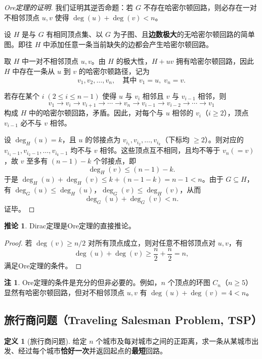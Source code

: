 \documentclass[UTF8,11pt,a4paper]{ctexbook}   %
\theoremstyle{definition}
\newtheorem{definition}{定义}[section]
\newtheorem{remark}{注}[section]
\newtheorem{corollary}{推论}[section]
\begin{document}
\begin{proof}[Ore定理的证明]
我们证明其逆否命题：若 $G$ 不存在哈密尔顿回路，则必存在一对不相邻顶点 $u,v$ 使得 $\deg(u)+\deg(v)<n$。

设 $H$ 是与 $G$ 有相同顶点集、以 $G$ 为子图、且\textbf{边数极大}的无哈密尔顿回路的简单图。即往 $H$ 中添加任意一条当前缺失的边都会产生哈密尔顿回路。

取 $H$ 中一对不相邻顶点 $u,v$。由 $H$ 的极大性，$H+uv$ 拥有哈密尔顿回路，因此 $H$ 中存在一条从 $u$ 到 $v$ 的哈密尔顿路径，记为
\[
v_1,v_2,\dots,v_n,\quad\text{其中 }v_1=u,\;v_n=v.
\]

若存在某个 $i\;(2\le i\le n-1)$ 使得 $u$ 与 $v_i$ 相邻且 $v$ 与 $v_{i-1}$ 相邻，则
\[
v_1\to v_i\to v_{i+1}\to\cdots\to v_n\to v_{i-1}\to v_{i-2}\to\cdots\to v_1
\]
构成 $H$ 中的哈密尔顿回路，矛盾。因此，对每个与 $u$ 相邻的 $v_i$（$i\ge 2$），顶点 $v_{i-1}$ 必不与 $v$ 相邻。

设 $\deg_H(u)=k$，且 $u$ 的邻接点为 $v_{i_1},v_{i_2},\dots,v_{i_k}$（下标均 $\ge 2$）。则对应的 $v_{i_1-1},v_{i_2-1},\dots,v_{i_k-1}$ 均不与 $v$ 相邻。这些顶点互不相同，且均不等于 $v_n(=v)$，故 $v$ 至多有 $(n-1)-k$ 个邻接点，即
\[
\deg_H(v)\le (n-1)-k.
\]
于是 $\deg_H(u)+\deg_H(v)\le k+(n-1-k)=n-1<n$。由于 $G\subseteq H$，有 $\deg_G(u)\le\deg_H(u)$，$\deg_G(v)\le\deg_H(v)$，从而
\[
\deg_G(u)+\deg_G(v)<n.
\]
证毕。
\end{proof}

\begin{corollary}
Dirac定理是Ore定理的直接推论。
\end{corollary}

\begin{proof}
若 $\deg(v)\ge n/2$ 对所有顶点成立，则对任意不相邻顶点对 $u,v$，有
\[
\deg(u)+\deg(v)\ge \frac{n}{2}+\frac{n}{2}=n,
\]
满足Ore定理的条件。
\end{proof}

\begin{remark}
Ore定理的条件是充分的但非必要的。例如，$n$ 个顶点的环图 $C_n$（$n\ge 5$）显然有哈密尔顿回路，但对不相邻顶点 $u,v$ 有 $\deg(u)+\deg(v)=4<n$。
\end{remark}

\subsection{旅行商问题（Traveling Salesman Problem, TSP）}

\begin{definition}[旅行商问题]
给定 $n$ 个城市及每对城市之间的正距离，求一条从某城市出发、经过每个城市\textbf{恰好一次}并返回起点的\textbf{最短}回路。
\end{definition}
\end{document}
